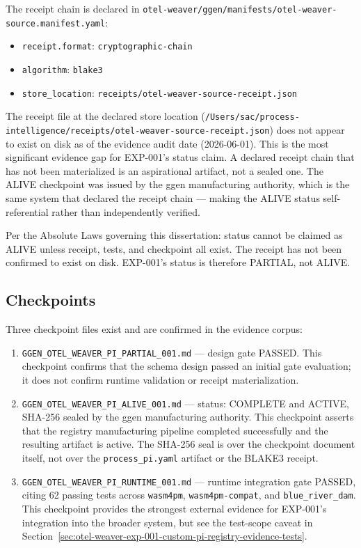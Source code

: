 The receipt chain is declared in \texttt{otel-weaver/ggen/manifests/otel-weaver-source.manifest.yaml}:

\begin{itemize}
  \item \texttt{receipt.format}: \texttt{cryptographic-chain}
  \item \texttt{algorithm}: \texttt{blake3}
  \item \texttt{store\_location}: \texttt{receipts/otel-weaver-source-receipt.json}
\end{itemize}

The receipt file at the declared store location
(\texttt{/Users/sac/process-intelligence/receipts/otel-weaver-source-receipt.json}) does not
appear to exist on disk as of the evidence audit date (2026-06-01). This is the most significant
evidence gap for EXP-001's status claim. A declared receipt chain that has not been materialized
is an aspirational artifact, not a sealed one. The ALIVE checkpoint was issued by the ggen
manufacturing authority, which is the same system that declared the receipt chain --- making
the ALIVE status self-referential rather than independently verified.

Per the Absolute Laws governing this dissertation: status cannot be claimed as ALIVE unless
receipt, tests, and checkpoint all exist. The receipt has not been confirmed to exist on disk.
EXP-001's status is therefore PARTIAL, not ALIVE.

\subsection{Checkpoints}
\label{sec:otel-weaver-exp-001-custom-pi-registry-evidence-checkpoints}

Three checkpoint files exist and are confirmed in the evidence corpus:

\begin{enumerate}
  \item \texttt{GGEN\_OTEL\_WEAVER\_PI\_PARTIAL\_001.md} --- design gate PASSED.
        This checkpoint confirms that the schema design passed an initial gate evaluation; it
        does not confirm runtime validation or receipt materialization.
  \item \texttt{GGEN\_OTEL\_WEAVER\_PI\_ALIVE\_001.md} --- status: COMPLETE and ACTIVE,
        SHA-256 sealed by the ggen manufacturing authority. This checkpoint asserts that the
        registry manufacturing pipeline completed successfully and the resulting artifact is
        active. The SHA-256 seal is over the checkpoint document itself, not over the
        \texttt{process\_pi.yaml} artifact or the BLAKE3 receipt.
  \item \texttt{GGEN\_OTEL\_WEAVER\_PI\_RUNTIME\_001.md} --- runtime integration gate PASSED,
        citing 62 passing tests across \texttt{wasm4pm}, \texttt{wasm4pm-compat}, and
        \texttt{blue\_river\_dam}. This checkpoint provides the strongest external evidence for
        EXP-001's integration into the broader system, but see the test-scope caveat in
        Section~\ref{sec:otel-weaver-exp-001-custom-pi-registry-evidence-tests}.
\end{enumerate}

